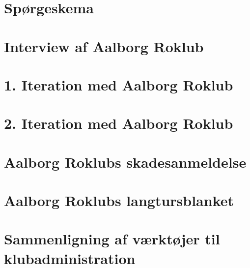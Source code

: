 \appendix

\chapter{Spørgeskema}




\label{FIRSTAPPENDIX}

\chapter{Interview af Aalborg Roklub}



\chapter{1. Iteration med Aalborg Roklub}



\chapter{2. Iteration med Aalborg Roklub}



\chapter{Aalborg Roklubs skadesanmeldelse}


\chapter{Aalborg Roklubs langtursblanket}


\chapter{Sammenligning af værktøjer til klubadministration}


%

